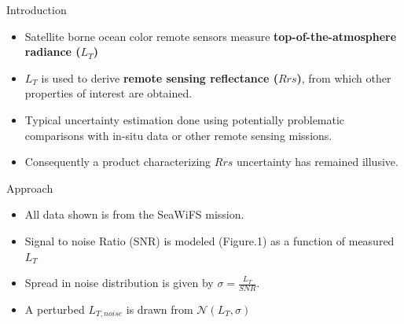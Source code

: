 \documentclass[final]{beamer}
\newlength{\onecolwid}
\begin{document}
\begin{frame}[t]
\begin{columns}[t]
\begin{column}{\onecolwid}
\begin{block}{Introduction}
\begin{itemize}
\item Satellite borne ocean color remote sensors measure \textbf{top-of-the-atmosphere radiance ($L_T$)}
\item $L_T$ is used to derive \textbf{remote sensing reflectance ($Rrs$)}, from which other  properties of interest are obtained.
\item Typical uncertainty estimation done using potentially problematic comparisons with in-situ data or other remote sensing missions\cite{BW:2006,Tle:2000,Hu:2013}.
\item Consequently a product characterizing $Rrs$ uncertainty has remained illusive.
\end{itemize}
\end{block}


\begin{block}{Approach}
\begin{itemize}
\item All data shown is from the SeaWiFS mission.
\item Signal to noise Ratio (SNR) is modeled (Figure.1) as a function of measured $L_T$
\item Spread in noise distribution is given by $\sigma = \frac{L_T}{SNR}$.
\item A perturbed $L_{T,noise}$ is drawn from $\mathcal{N}(L_T, \sigma)$
\end{itemize}


\end{block}
\end{column}
\end{columns}
\end{frame}
\end{document}
